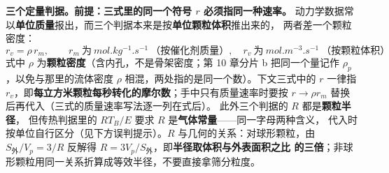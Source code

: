 \begin{principle}
\textbf{三个定量判据。}\textbf{前提：三式里的同一个符号 $r$ 必须指同一种速率。}
动力学数据常以\textbf{单位质量}报出，而三个判据本来是按\textbf{单位颗粒体积}推出来的，
两者差一个颗粒密度：
\begin{equation}
r_v=\rho\,r_m,\qquad
r_m\ \text{为}\ \unit{mol.kg^{-1}.s^{-1}}\ \text{（按催化剂质量）},\quad
r_v\ \text{为}\ \unit{mol.m^{-3}.s^{-1}}\ \text{（按颗粒体积）}
\label{eq:rate-basis}
\end{equation}
式中 $\rho$ 为\textbf{颗粒密度}（含内孔，不是骨架密度；第 10 章分片 b 把同一个量记作
$\rho_p$，以免与那里的流体密度 $\rho$ 相混，两处指的是同一个数）。下文三式中的 $r$ 一律指
$r_v$，即\textbf{每立方米颗粒每秒转化的摩尔数}；手中只有质量速率时要按
$r\to\rho r_m$ 替换后再代入（三式的质量速率写法逐一列在式后）。
此外三个判据的 $R$ 都是\textbf{颗粒半径}，
但传热判据里的 $R T_B/E$ 要求 $R$ 是\textbf{气体常量}——同一字母两种含义，
代入时按单位自行区分（见下方误判提示）。$R$ 与几何的关系：对球形颗粒，由
$S_{\text{外}}/V_p=3/R$ 反解得 $R=3V_p/S_{\text{外}}$，即\textbf{半径取体积与外表面积之比
的三倍}；非球形颗粒用同一关系折算成等效半径，不要直接拿筛分粒度。


\end{principle}
